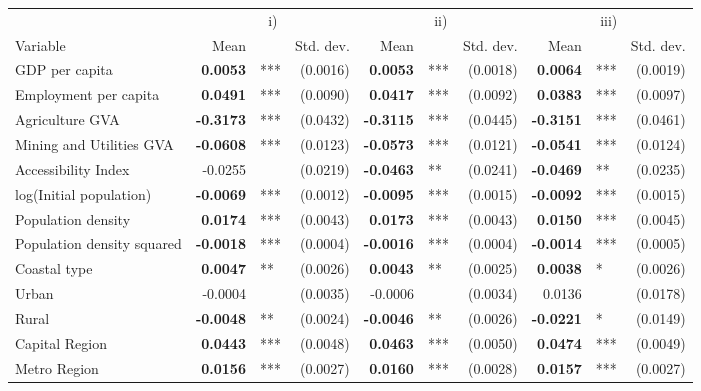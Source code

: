 \begin{table}[t]
\centering
\addtolength{\tabcolsep}{-0.6em}
\begin{tabular}{lrl@{~}r@{~~~~~}rl@{~}r@{~~~~~}rl@{~}r}
   \toprule
 \multicolumn{1}{c}{} & \multicolumn{3}{c}{i)} & \multicolumn{3}{c}{ii)} & \multicolumn{3}{c}{iii)} \\ 
 Variable & Mean && Std. dev. & Mean && Std. dev. & Mean && Std. dev. \\ 
 \midrule
GDP per capita & \textbf{0.0053} & *** & (0.0016) & \textbf{0.0053} & *** & (0.0018) & \textbf{0.0064} & *** & (0.0019) \\ 
  Employment per capita & \textbf{0.0491} & *** & (0.0090) & \textbf{0.0417} & *** & (0.0092) & \textbf{0.0383} & *** & (0.0097) \\ 
  Agriculture GVA & \textbf{-0.3173} & *** & (0.0432) & \textbf{-0.3115} & *** & (0.0445) & \textbf{-0.3151} & *** & (0.0461) \\ 
  Mining and Utilities GVA & \textbf{-0.0608} & *** & (0.0123) & \textbf{-0.0573} & *** & (0.0121) & \textbf{-0.0541} & *** & (0.0124) \\ 
  Accessibility Index & -0.0255 &  & (0.0219) & \textbf{-0.0463} & ** & (0.0241) & \textbf{-0.0469} & ** & (0.0235) \\ 
  log(Initial population) & \textbf{-0.0069} & *** & (0.0012) & \textbf{-0.0095} & *** & (0.0015) & \textbf{-0.0092} & *** & (0.0015) \\ 
  Population density & \textbf{0.0174} & *** & (0.0043) & \textbf{0.0173} & *** & (0.0043) & \textbf{0.0150} & *** & (0.0045) \\ 
  Population density squared & \textbf{-0.0018} & *** & (0.0004) & \textbf{-0.0016} & *** & (0.0004) & \textbf{-0.0014} & *** & (0.0005) \\ 
  Coastal type & \textbf{0.0047} & ** & (0.0026) & \textbf{0.0043} & ** & (0.0025) & \textbf{0.0038} & * & (0.0026) \\ 
  Urban & -0.0004 &  & (0.0035) & -0.0006 &  & (0.0034) & 0.0136 &  & (0.0178) \\ 
  Rural & \textbf{-0.0048} & ** & (0.0024) & \textbf{-0.0046} & ** & (0.0026) & \textbf{-0.0221} & * & (0.0149) \\ 
  Capital Region & \textbf{0.0443} & *** & (0.0048) & \textbf{0.0463} & *** & (0.0050) & \textbf{0.0474} & *** & (0.0049) \\ 
  Metro Region & \textbf{0.0156} & *** & (0.0027) & \textbf{0.0160} & *** & (0.0028) & \textbf{0.0157} & *** & (0.0027) \\ 

\end{tabular}
\end{table}

